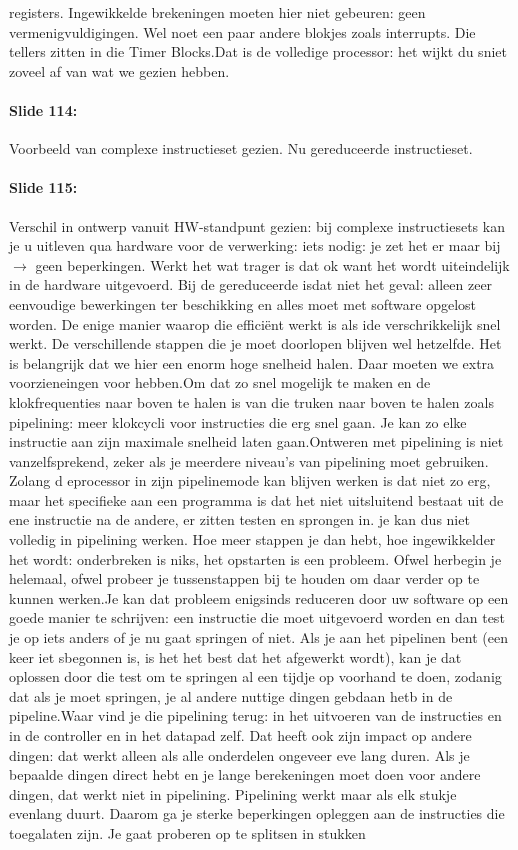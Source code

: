 \documentclass[10pt,a4paper]{book}
\begin{document}
registers. Ingewikkelde brekeningen moeten hier niet gebeuren: geen vermenigvuldigingen. Wel noet een paar andere blokjes zoals interrupts. Die tellers zitten in die Timer Blocks.Dat is de volledige processor: het wijkt du sniet zoveel af van wat we gezien hebben.

\paragraph{Slide 114:} Voorbeeld van complexe instructieset gezien. Nu gereduceerde instructieset.

\paragraph{Slide 115:} Verschil in ontwerp vanuit HW-standpunt gezien: bij complexe instructiesets kan je u uitleven qua hardware voor de verwerking: iets nodig: je zet het er maar bij $\rightarrow$ geen beperkingen. Werkt het wat trager is dat ok want het wordt uiteindelijk in de hardware uitgevoerd. Bij de gereduceerde isdat niet het geval: alleen zeer eenvoudige bewerkingen ter beschikking en alles moet met software opgelost worden. De enige manier waarop die effici\"ent werkt is als ide verschrikkelijk snel werkt. De verschillende stappen die je moet doorlopen blijven wel hetzelfde. Het is belangrijk dat we hier een enorm hoge snelheid halen. Daar moeten we extra voorzieneingen voor hebben.Om dat zo snel mogelijk te maken en de klokfrequenties naar boven te halen is van die truken naar boven te halen zoals pipelining: meer klokcycli voor instructies die erg snel gaan. Je kan zo elke instructie aan zijn maximale snelheid laten gaan.Ontweren met pipelining is niet vanzelfsprekend, zeker als je meerdere niveau's van pipelining moet gebruiken. Zolang d eprocessor in zijn pipelinemode kan blijven werken is dat niet zo erg, maar het specifieke aan een programma is dat het niet uitsluitend bestaat uit de ene instructie na de andere, er zitten testen en sprongen in. je kan dus niet volledig in pipelining werken. Hoe meer stappen je dan hebt, hoe ingewikkelder het wordt: onderbreken is niks, het opstarten is een probleem. Ofwel herbegin je helemaal, ofwel probeer je tussenstappen bij te houden om daar verder op te kunnen werken.Je kan dat probleem enigsinds reduceren door uw software op een goede manier te schrijven: een instructie die moet uitgevoerd worden en dan test je op iets anders of je nu gaat springen of niet. Als je aan het pipelinen bent (een keer iet sbegonnen is, is het het best dat het afgewerkt wordt), kan je dat oplossen door die test om te springen al een tijdje op voorhand te doen, zodanig dat als je moet springen, je al andere nuttige dingen gebdaan hetb in de pipeline.Waar vind je die pipelining terug: in het uitvoeren van de instructies en in de controller en in het datapad zelf. Dat heeft ook zijn impact op andere dingen: dat werkt alleen als alle onderdelen ongeveer eve lang duren. Als je bepaalde dingen direct hebt en je lange berekeningen moet doen voor andere dingen, dat werkt niet in pipelining. Pipelining werkt maar als elk stukje evenlang duurt. Daarom ga je sterke beperkingen opleggen aan de instructies die toegalaten zijn. Je gaat proberen op te splitsen in stukken 
\end{document}
